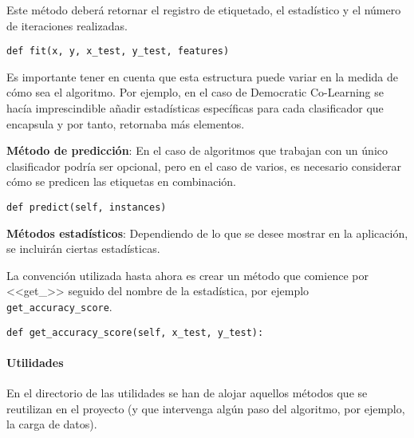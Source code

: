 Este método deberá retornar el registro de etiquetado, el estadístico y el
número de iteraciones realizadas.

\begin{tcolorbox}[colback=cyan!5!white,colframe=cyan!75!black,title=Cabecera fit]
\begin{verbatim}
def fit(x, y, x_test, y_test, features)
\end{verbatim}
\end{tcolorbox}

Es importante tener en cuenta que esta estructura puede variar en la medida de
cómo sea el algoritmo. Por ejemplo, en el caso de Democratic Co-Learning se
hacía imprescindible añadir estadísticas específicas para cada clasificador que
encapsula y por tanto, retornaba más elementos.

\textbf{Método de predicción}: En el caso de algoritmos que trabajan con un único
clasificador podría ser opcional, pero en el caso de varios, es necesario
considerar cómo se predicen las etiquetas en combinación.

\begin{tcolorbox}[colback=cyan!5!white,colframe=cyan!75!black,title=Cabecera predict]
\begin{verbatim}
def predict(self, instances)
\end{verbatim}
\end{tcolorbox}
    

\textbf{Métodos estadísticos}: Dependiendo de lo que se desee mostrar en la
aplicación, se incluirán ciertas estadísticas.

La convención utilizada hasta ahora es crear un método que comience por <<get\_>>
seguido del nombre de la estadística, por ejemplo \texttt{get\_accuracy\_score}.

\begin{tcolorbox}[colback=cyan!5!white,colframe=cyan!75!black,title=Cabecera ejemplo estadística]
\begin{verbatim}
def get_accuracy_score(self, x_test, y_test):
\end{verbatim}
\end{tcolorbox}

\paragraph{Utilidades} En el directorio de las utilidades se han de alojar
aquellos métodos que se reutilizan en el proyecto (y que intervenga algún paso
del algoritmo, por ejemplo, la carga de datos). 


